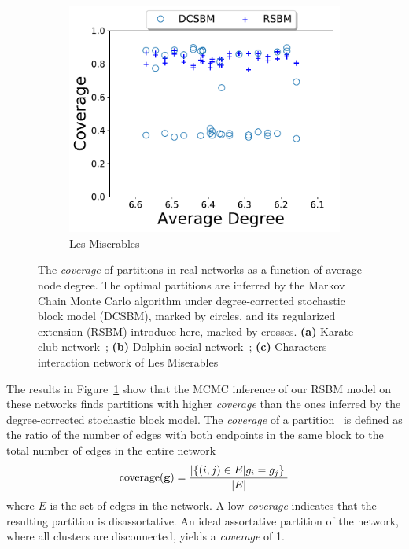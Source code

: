\begin{figure}[!htb]
\begin{subfigure}{.3\textwidth} 
\centering
\includegraphics[width=.99\linewidth]{img/chap2/lesmis_scatter_real.pdf}
\caption{Les Miserables}
\end{subfigure}
    
    
    \caption{The \textit{coverage} of partitions in real networks as a function of average node degree. The optimal partitions are inferred by the Markov Chain Monte Carlo algorithm under degree-corrected stochastic block model (DCSBM), marked by circles, and its regularized extension (RSBM) introduce here, marked by crosses. \textbf{(a)} Karate club network~\cite{zachary1977information}; \textbf{(b)} Dolphin social network~\cite{lusseau2003bottlenose}; \textbf{(c)} Characters interaction network of Les Miserables~\cite{newman2004finding}}
    \label{fig:gsbm_real}
\end{figure}

The results in Figure~\ref{fig:gsbm_real} show that the MCMC inference of our RSBM model on these networks finds partitions with higher \textit{coverage} than the ones inferred by the degree-corrected stochastic block model. The \textit{coverage} of a partition~\cite{fortunato2010community} is defined as the ratio of the number of edges with both endpoints in the same block to the total number of edges in the entire network
\begin{equation}
    \text{coverage({\bf g})} = \frac{|\{(i,j)\in E| g_i = g_j\}|}{|E|}
\end{equation}
where $E$ is the set of edges in the network. A low \textit{coverage} indicates that the resulting partition is disassortative. An ideal assortative partition of the network, where all clusters are disconnected, yields a \textit{coverage} of 1.

